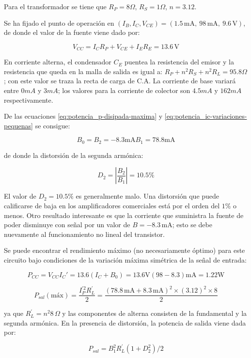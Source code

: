 Para el transformador se tiene que $R_P = 8\Omega$, $R_S = 1\Omega$, $n = 3.12$.

Se ha fijado el punto de operación en $(I_B, I_C, V_{CE}) = (1.5\,\text{mA},\ 98\,\text{mA},\ 9.6\,\text{V})$, de donde el valor de la fuente viene dado por:

\[
V_{CC} = I_C R_P + V_{CE} + I_E R_E = 13.6\,\text{V}
\]

En corriente alterna, el condensador $C_E$ puentea la resistencia del emisor y la resistencia que queda en la malla de salida es igual a: \( R_P + n^2 R_S + n^2 R_L = 95.8 \Omega\); con este valor se traza la recta de carga de C.A. La corriente de base variará entre $0 mA$ y $3 mA$; los valores para la corriente de colector son $4.5 mA$ y $162 mA$ respectivamente. 

De las ecuaciones \ref{eq:potencia_p-disipada-maxima} y \ref{eq:potencia_ic-variaciones-pequenas} se consigue:

\[
B_0 = B_2 = -8.3 \text{mA}
B_1 = 78.8 \text{mA}
\]

de donde la distorsión de la segunda armónica:

\[
D_2 = \left| \frac{B_2}{B_1} \right| = 10.5\%
\]

El valor de $D_2 = 10.5\%$ es generalmente malo. Una distorsión que puede calificarse de baja en los amplificadores comerciales está por el orden del $1\%$ o menos. Otro resultado interesante es que la corriente que suministra la fuente de poder disminuye con señal por un valor de $B = -8.3\,\text{mA}$; esto se debe nuevamente al funcionamiento no lineal del transistor.

Se puede encontrar el rendimiento máximo (no necesariamente óptimo) para este circuito bajo condiciones de la variación máxima simétrica de la señal de entrada:

\[
P_{CC} = V_{CC} I_C' = 13.6 (I_C + B_0) = 13.6 \text{V} (98 - 8.3) \text{mA} = 1.22 \text{W}
\]

\[
P_{sal}(\text{máx}) = \frac{I_P^{\prime 2} R_L^{\prime}}{2} = \frac{(78.8\,\text{mA} + 8.3\,\text{mA})^2 \times (3.12)^2 \times 8}{2}
\]

ya que $R_L^{\prime} = n^2 8\,\Omega$ y las componentes de alterna consisten de la fundamental y la segunda armónica. En la presencia de distorsión, la potencia de salida viene dada por:

\begin{equation}
	P_{sal} = B_1^2 R_L^{\prime} (1 + D_2^2)/2
\end{equation}

